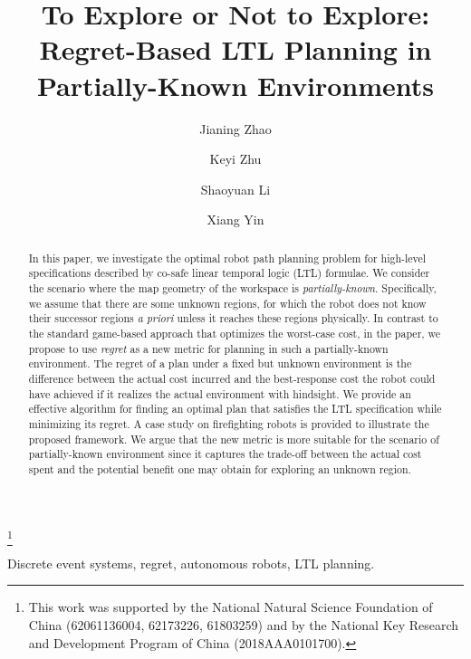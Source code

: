 \documentclass{ifacconf}
\begin{document}
\begin{frontmatter}

\title{\large To Explore or Not to Explore:  Regret-Based LTL Planning    in Partially-Known Environments} 

\thanks[footnoteinfo]{This work was supported by the National Natural Science Foundation of China (62061136004, 62173226, 61803259) and by the National Key Research and Development Program of China (2018AAA0101700).}

\author[First]{Jianing Zhao} 
\author[First]{Keyi Zhu}
\author[First]{Shaoyuan Li}
\author[First]{Xiang Yin}

\address[First]{Department of Automation, Shanghai Jiao Tong University\\
   Shanghai 200240, China\\ (e-mail: \{jnzhao,bai12wp,syli,yinxiang\}@sjtu.edu.cn)}
\begin{abstract}                %
In this paper, we investigate the optimal robot path planning problem for high-level specifications described by co-safe linear temporal logic (LTL) formulae.  We consider the scenario where the map geometry of the workspace is \emph{partially-known}. Specifically, we assume that there are some unknown regions, for which the robot does not know their successor regions \emph{a priori} unless it reaches these regions physically. In contrast to the standard game-based approach that optimizes the worst-case cost, in the paper, we propose to use \emph{regret} as a new metric for  planning  in such a partially-known environment. The regret of a plan under a fixed but unknown environment is the difference between the actual cost incurred and the best-response cost the robot could have achieved if it realizes the actual environment with hindsight. We provide an effective algorithm for finding an optimal plan that satisfies the LTL specification while minimizing its regret. A case study on  firefighting  robots is provided to illustrate the proposed framework. We argue that the new metric is more suitable for the scenario of partially-known environment since it captures the trade-off between the actual cost spent and the potential benefit one may obtain for exploring an unknown region. 
\end{abstract}

\begin{keyword}
Discrete event systems, regret, autonomous robots, LTL planning.
\end{keyword}

\end{frontmatter}
\end{document}
